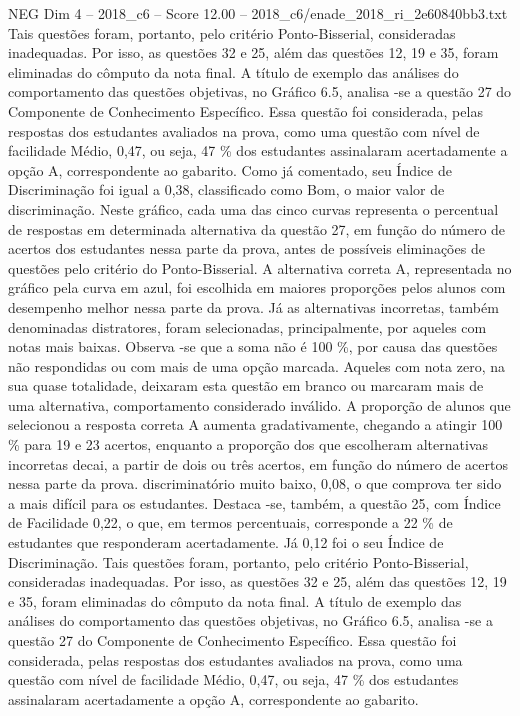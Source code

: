 \begin{textsample}{NEG Dim 4 – 2018\_c6 – Score 12.00 – 2018\_c6/enade\_2018\_ri\_2e60840bb3.txt}
Tais questões foram, portanto, pelo critério Ponto-Bisserial, consideradas inadequadas.
Por isso, as questões 32 e 25, além das questões 12, 19 e 35, foram eliminadas do cômputo da nota final.
A título de exemplo das análises do comportamento das questões objetivas, no Gráfico 6.5, analisa -se a questão 27 do Componente de Conhecimento Específico.
Essa questão foi considerada, pelas respostas dos estudantes avaliados na prova, como uma questão com nível de facilidade Médio, 0,47, ou seja, 47 \% dos estudantes assinalaram acertadamente a opção A, correspondente ao gabarito.
Como já comentado, seu Índice de Discriminação foi igual a 0,38, classificado como Bom, o maior valor de discriminação.
Neste gráfico, cada uma das cinco curvas representa o percentual de respostas em determinada alternativa da questão 27, em função do número de acertos dos estudantes nessa parte da prova, antes de possíveis eliminações de questões pelo critério do Ponto-Bisserial.
A alternativa correta A, representada no gráfico pela curva em azul, foi escolhida em maiores proporções pelos alunos com desempenho melhor nessa parte da prova.
Já as alternativas incorretas, também denominadas distratores, foram selecionadas, principalmente, por aqueles com notas mais baixas.
Observa -se que a soma não é 100 \%, por causa das questões não respondidas ou com mais de uma opção marcada.
Aqueles com nota zero, na sua quase totalidade, deixaram esta questão em branco ou marcaram mais de uma alternativa, comportamento considerado inválido.
A proporção de alunos que selecionou a resposta correta A aumenta gradativamente, chegando a atingir 100 \% para 19 e 23 acertos, enquanto a proporção dos que escolheram alternativas incorretas decai, a partir de dois ou três acertos, em função do número de acertos nessa parte da prova. discriminatório muito baixo, 0,08, o que comprova ter sido a mais difícil para os estudantes.
Destaca -se, também, a questão 25, com Índice de Facilidade 0,22, o que, em termos percentuais, corresponde a 22 \% de estudantes que responderam acertadamente.
Já 0,12 foi o seu Índice de Discriminação.
Tais questões foram, portanto, pelo critério Ponto-Bisserial, consideradas inadequadas.
Por isso, as questões 32 e 25, além das questões 12, 19 e 35, foram eliminadas do cômputo da nota final.
A título de exemplo das análises do comportamento das questões objetivas, no Gráfico 6.5, analisa -se a questão 27 do Componente de Conhecimento Específico.
Essa questão foi considerada, pelas respostas dos estudantes avaliados na prova, como uma questão com nível de facilidade Médio, 0,47, ou seja, 47 \% dos estudantes assinalaram acertadamente a opção A, correspondente ao gabarito.

\end{textsample}
